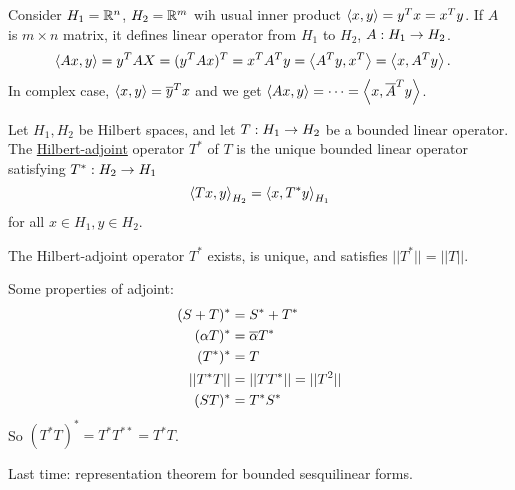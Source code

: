 \documentclass[]{article}
\begin{document}
Consider $H_1=\mathbb{R}^n$, $H_2=\mathbb{R}^m$ wih usual inner product $\left\langle x,y \right\rangle= y^Tx = x^Ty$.
If $A$ is $m\times n$ matrix, it defines linear operator from $H_1$ to $H_2$, $A:H_1\rightarrow H_2$.
\begin{align*}
	\left\langle Ax,y \right\rangle &= y^TAX
			   = (y^TAx)^T
			   = x^TA^Ty
			   = \left\langle A^Ty,x^T \right\rangle
			   = \left\langle x,A^Ty \right\rangle.
\end{align*}
In complex case, $\left\langle x,y \right\rangle = \overline{y}^Tx$ and we get $\left\langle Ax,y \right\rangle=\dots=\left\langle x,\overline{A}^Ty \right\rangle$.
\begin{definition}
	Let $H_1,H_2$ be Hilbert spaces, and let $T:H_1\rightarrow H_2$ be a bounded linear operator.
	The \ul{Hilbert-adjoint} operator $T^*$ of $T$ is the unique bounded linear operator satisfying $T^*:H_2\rightarrow H_1$ $$\left\langle Tx,y \right\rangle_{H_2} = \left\langle x,T^*y \right\rangle_{H_1}$$ for all $x\in H_1,y\in H_2$.
\end{definition}

\newpage

\begin{theorem}
	The Hilbert-adjoint operator $T^*$ exists, is unique, and satisfies $||T^*||=||T||$.
\end{theorem}
Some properties of adjoint:
\begin{align*}
	(S+T)^* &= S^*+T^* \\
	(\alpha T)^* &= \overline{\alpha} T^* \\
	(T^*)^* &= T \\
	||T^*T|| &= ||TT^*|| = ||T^2|| \\
	(ST)^* &= T^*S^*
\end{align*}
So $(T^*T)^* = T^*T^{**} = T^*T$.

Last time: representation theorem for bounded sesquilinear forms.
\end{document}

